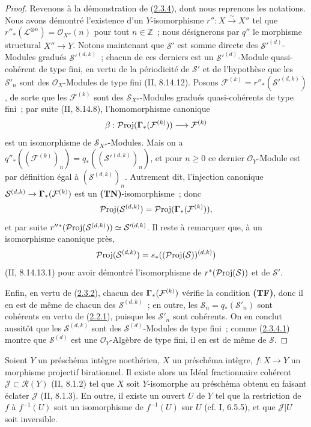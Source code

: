 \begin{proof}
Revenons à la démonstration de
(\hyperref[III.2.3.4-fr]{2.3.4}), dont nous reprenons les notations. Nous
avons démontré l'existence d'un $Y$-isomorphisme $r'':X\xrightarrow{\sim}X''$
tel que $r''_*(\mathcal L^{\otimes n})=\mathcal O_{X''}(n)$ pour tout
$n\in\mathbb Z$~; nous désignerons par $q''$ le morphisme structural
$X''\to Y$. Notons maintenant que $\mathcal S'$ est somme directe des
$\mathcal S'^{(d)}$-Modules gradués $\mathcal S'^{(d,k)}$~; chacun de ces
derniers est un $\mathcal S'^{(d)}$-Module quasi-cohérent de type fini, en
vertu de la périodicité de $\mathcal S'$ et de l'hypothèse que les
$\mathcal S'_n$ sont des $\mathcal O_X$-Modules de type fini
(II, 8.14.12). Posons
$\mathcal F^{(k)}=r''_*(\mathcal S'^{(d,k)})$, de sorte que les
$\mathcal F^{(k)}$ sont des $\mathcal S_{X''}$-Modules gradués
quasi-cohérents de type fini~; par suite (II, 8.14.8), l'homomorphisme
canonique
\[
\beta:\mathcal{P}\mathrm{roj}(\boldsymbol{\Gamma}_*(\mathcal F^{(k)}))
\longrightarrow\mathcal F^{(k)}
\]
est un isomorphisme de $\mathcal S_{X''}$-Modules. Mais on a
$q''_*((\mathcal F^{(k)})_n)=q_*((\mathcal S'^{(d,k)})_n)$, et pour
$n\geq0$ ce dernier $\mathcal O_Y$-Module est par définition égal à
$(\mathcal S^{(d,k)})_n$. Autrement dit, l'injection canonique
$\mathcal S^{(d,k)}\to\boldsymbol{\Gamma}_*(\mathcal F^{(k)})$ est un
\textbf{(TN)}-isomorphisme~; donc
\[
\mathcal{P}\mathrm{roj}(\mathcal S^{(d,k)})
=\mathcal{P}\mathrm{roj}(\boldsymbol{\Gamma}_*(\mathcal F^{(k)})),
\]
et par suite
$r''{}^*(\mathcal{P}\mathrm{roj}(\mathcal S^{(d,k)}))\simeq\mathcal S'^{(d,k)}$.
Il reste à remarquer que, à un isomorphisme canonique près,
\[
\mathcal{P}\mathrm{roj}(\mathcal S^{(d,k)})
=s_*((\mathcal{P}\mathrm{roj}(\mathcal S))^{(d,k)})
\]
(II, 8.14.13.1) pour avoir démontré l'isomorphisme de
$r^*(\mathcal{P}\mathrm{roj}(\mathcal S))$ et de $\mathcal S'$.

Enfin, en vertu de (\hyperref[III.2.3.2-fr]{2.3.2}), chacun des
$\boldsymbol{\Gamma}_*(\mathcal F^{(k)})$ vérifie la condition \textbf{(TF)}, donc il
en est de même de chacun des $\mathcal S^{(d,k)}$~; en outre, les
$\mathcal S_n=q_*(\mathcal S'_n)$ sont cohérents en vertu de
(\hyperref[III.2.2.1-fr]{2.2.1}), puisque les $\mathcal S'_n$ sont
cohérents. On en conclut aussitôt que les $\mathcal S^{(d,k)}$ sont des
$\mathcal S^{(d)}$-Modules de type fini~; comme
(\hyperref[III.2.3.4.1-fr]{2.3.4.1}) montre que $\mathcal S^{(d)}$ est une
$\mathcal O_Y$-Algèbre de type fini, il en est de même de $\mathcal S$.
\end{proof}

\begin{proposition}[2.3.5]
\label{III.2.3.5-fr}
Soient $Y$ un préschéma intègre noethérien, $X$ un préschéma intègre,
$f:X\to Y$ un morphisme projectif birationnel. Il existe alors un Idéal
fractionnaire cohérent $\mathcal J\subset\mathcal R(Y)$ (II, 8.1.2) tel
que $X$ soit $Y$-isomorphe au préschéma obtenu en faisant éclater
$\mathcal J$ (II, 8.1.3). En outre, il existe un ouvert $U$ de $Y$ tel que
la restriction de $f$ à $f^{-1}(U)$ soit un isomorphisme de $f^{-1}(U)$
sur $U$ (cf. I, 6.5.5), et que $\mathcal J|U$ soit inversible.
\end{proposition}


